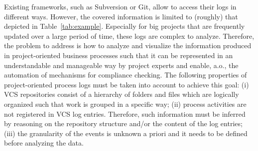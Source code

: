 
Existing frameworks, such as Subversion or Git, allow to access their logs in different ways. However, the covered information is limited to (roughly) that depicted in Table~\ref{tab:example}. Especially for big projects that are frequently updated over a large period of time, these logs are complex to analyze.
Therefore, the problem to address is how to analyze and visualize the information produced in project-oriented business processes such that it can be represented in an understandable and manageable way by project experts and
enable, a.o., the automation of mechanisms for compliance checking.
The following properties of project-oriented process logs must be taken into account to achieve this goal: (i) VCS repositories consist of a hierarchy of folders and files which are logically organized such that work is grouped in a specific way; (ii) process activities are not registered in VCS log entries. Therefore, such information must be inferred by reasoning on the repository structure and/or the content of the log entries; (iii) the granularity of the events is unknown a priori and it needs to be defined before analyzing the data.




